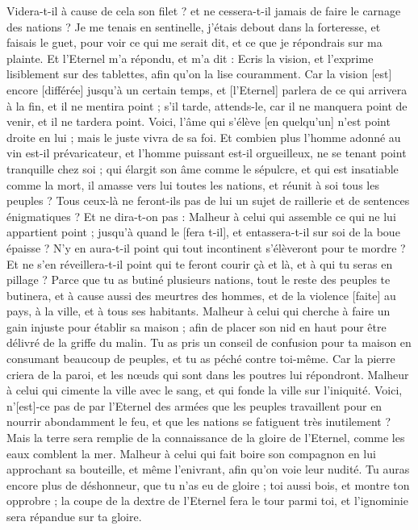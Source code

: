 \begin{multicols}{2}
Videra-t-il à cause de cela son filet ? et ne cessera-t-il jamais de faire le carnage des nations ?
\VerseOne{}Je me tenais en sentinelle, j'étais debout dans la forteresse, et faisais le guet, pour voir ce qui me serait dit, et ce que je répondrais sur ma plainte.
Et l'Eternel m'a répondu, et m'a dit : Ecris la vision, et l'exprime lisiblement sur des tablettes, afin qu'on la lise couramment.
Car la vision [est] encore [différée] jusqu'à un certain temps, et [l'Eternel] parlera de ce qui arrivera à la fin, et il ne mentira point ; s'il tarde, attends-le, car il ne manquera point de venir, et il ne tardera point.
Voici, l'âme qui s'élève [en quelqu'un] n'est point droite en lui ; mais le juste vivra de sa foi.
Et combien plus l'homme adonné au vin est-il prévaricateur, et l'homme puissant est-il orgueilleux, ne se tenant point tranquille chez soi ; qui élargit son âme comme le sépulcre, et qui est insatiable comme la mort, il amasse vers lui toutes les nations, et réunit à soi tous les peuples ?
Tous ceux-là ne feront-ils pas de lui un sujet de raillerie et de sentences énigmatiques ? Et ne dira-t-on pas : Malheur à celui qui assemble ce qui ne lui appartient point ; jusqu'à quand le [fera t-il], et entassera-t-il sur soi de la boue épaisse ?
N'y en aura-t-il point qui tout incontinent s'élèveront pour te mordre ? Et ne s'en réveillera-t-il point qui te feront courir çà et là, et à qui tu seras en pillage ?
Parce que tu as butiné plusieurs nations, tout le reste des peuples te butinera, et à cause aussi des meurtres des hommes, et de la violence [faite] au pays, à la ville, et à tous ses habitants.
Malheur à celui qui cherche à faire un gain injuste pour établir sa maison ; afin de placer son nid en haut pour être délivré de la griffe du malin.
Tu as pris un conseil de confusion pour ta maison en consumant beaucoup de peuples, et tu as péché contre toi-même.
Car la pierre criera de la paroi, et les nœuds qui sont dans les poutres lui répondront.
Malheur à celui qui cimente la ville avec le sang, et qui fonde la ville sur l'iniquité.
Voici, n'[est]-ce pas de par l'Eternel des armées que les peuples travaillent pour en nourrir abondamment le feu, et que les nations se fatiguent très inutilement ?
Mais la terre sera remplie de la connaissance de la gloire de l'Eternel, comme les eaux comblent la mer.
Malheur à celui qui fait boire son compagnon en lui approchant sa bouteille, et même l'enivrant, afin qu'on voie leur nudité.
Tu auras encore plus de déshonneur, que tu n'as eu de gloire ; toi aussi bois, et montre ton opprobre ; la coupe de la dextre de l'Eternel fera le tour parmi toi, et l'ignominie sera répandue sur ta gloire.

\end{multicols}
